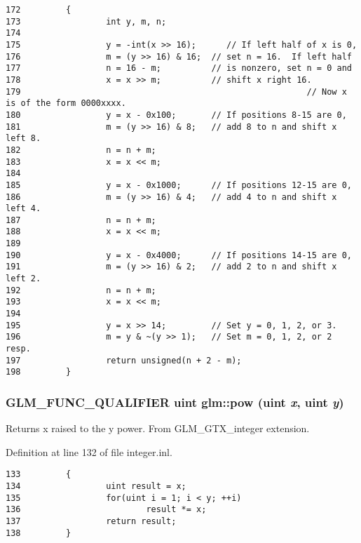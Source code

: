 \begin{Code}\begin{verbatim}172         {
173                 int y, m, n;
174 
175                 y = -int(x >> 16);      // If left half of x is 0,
176                 m = (y >> 16) & 16;  // set n = 16.  If left half
177                 n = 16 - m;          // is nonzero, set n = 0 and
178                 x = x >> m;          // shift x right 16.
179                                                         // Now x is of the form 0000xxxx.
180                 y = x - 0x100;       // If positions 8-15 are 0,
181                 m = (y >> 16) & 8;   // add 8 to n and shift x left 8.
182                 n = n + m;
183                 x = x << m;
184 
185                 y = x - 0x1000;      // If positions 12-15 are 0,
186                 m = (y >> 16) & 4;   // add 4 to n and shift x left 4.
187                 n = n + m;
188                 x = x << m;
189 
190                 y = x - 0x4000;      // If positions 14-15 are 0,
191                 m = (y >> 16) & 2;   // add 2 to n and shift x left 2.
192                 n = n + m;
193                 x = x << m;
194 
195                 y = x >> 14;         // Set y = 0, 1, 2, or 3.
196                 m = y & ~(y >> 1);   // Set m = 0, 1, 2, or 2 resp.
197                 return unsigned(n + 2 - m);
198         }
\end{verbatim}
\end{Code}


\hypertarget{group__gtx__integer_ga8229e850c3cc4ad83492fe390ada044}{
\subsubsection[pow]{\setlength{\rightskip}{0pt plus 5cm}GLM\_\-FUNC\_\-QUALIFIER uint glm::pow (uint {\em x}, \/  uint {\em y})}}
\label{group__gtx__integer_ga8229e850c3cc4ad83492fe390ada044}


Returns x raised to the y power. From GLM\_\-GTX\_\-integer extension. 

Definition at line 132 of file integer.inl.

\begin{Code}\begin{verbatim}133         {
134                 uint result = x;
135                 for(uint i = 1; i < y; ++i)
136                         result *= x;
137                 return result;
138         }
\end{verbatim}
\end{Code}


